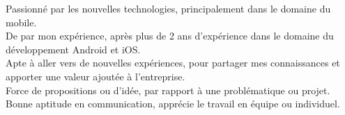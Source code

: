 

\begin{cvparagraph}

Passionné par les nouvelles technologies, principalement dans le domaine du mobile.\\ 
De par mon expérience, après plus de 2 ans d'expérience dans le domaine du développement Android et iOS. \\
Apte à aller vers de nouvelles expériences, pour partager mes connaissances et apporter une valeur ajoutée à l’entreprise.\\
Force de propositions ou d’idée, par rapport à une problématique ou projet.\\
Bonne aptitude en communication, apprécie le travail en équipe ou individuel. 
\end{cvparagraph}
